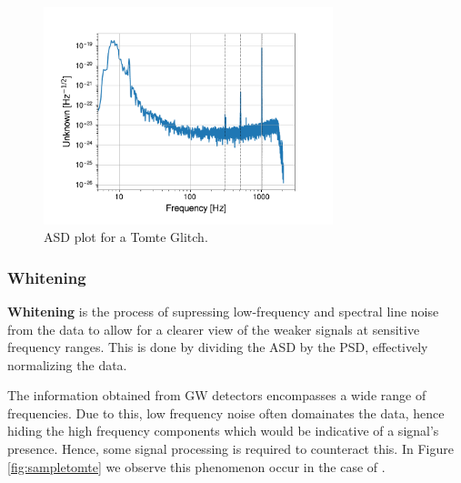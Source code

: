 \documentclass[12pt]{article}
\begin{document}
\begin{figure}[H]
  \centering
  \includegraphics[width=0.75\textwidth]{images/unwhitened_asd.pdf}
  \caption{ASD plot for a Tomte Glitch.}
  \label{fig:asdtomte}
\end{figure}

\subsubsection{Whitening}

\textbf{Whitening} is the process of supressing low-frequency and spectral line noise from the data to allow for a clearer view of the weaker signals at sensitive frequency ranges. This is done by dividing the ASD by the PSD, effectively normalizing the data.

The information obtained from GW detectors encompasses a wide range of frequencies. Due to this, low frequency noise often domainates the data, hence hiding the high frequency components which would be indicative of a signal's presence. Hence, some signal processing is required to counteract this. In Figure \ref{fig:sampletomte} we observe this phenomenon occur in the case of .
\end{document}
